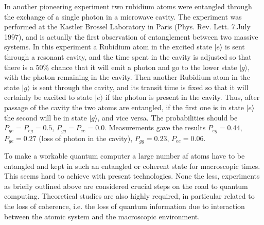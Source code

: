 In another pioneering experiment two rubidium atoms were entangled
through the exchange of a single photon in a microwave cavity.  The
experiment was performed at the Kastler Brossel Laboratory in Paris
(Phys. Rev. Lett. 7.July 1997), and is actually the first observation
of entanglement between two massive systems.  In this experiment a
Rubidium atom in the excited state $|e\rangle$ is sent through a
resonant cavity, and the time spent in the cavity is adjusted so that
there is a 50\% chance that it will emit a photon and go to the lower
state $|g\rangle$, with the photon remaining in the cavity.  Then
another Rubidium atom in the state $|g\rangle$ is sent through the
cavity, and its transit time is fixed so that it will certainly be
excited to state $|e\rangle$ if the photon is present in the cavity.
Thus, after passage of the cavity the two atoms are entangled, if the
first one is in state $|e\rangle$ the second will be in state
$|g\rangle$, and vice versa.  The probabilities should be
$P_{ge}=P_{eg}=0.5$, $P_{gg}=P_{ee}=0.0$.  Measurements gave the
results $P_{eg}=0.44$, $P_{ge}=0.27$ (loss of photon in the cavity),
$P_{gg}=0.23$, $P_{ee}=0.06$.

To make a workable quantum computer a large number af atoms have to be
entangled and kept in such an entangled or coherent state for
macroscopic times. This seems hard to achieve with present
technologies. None the less, experiments as briefly outlined above are
considered crucial steps on the road to quantum computing. Theoretical
studies are also highly required, in particular related to the loss of
coherence, i.e.  the loss of quantum information due to interaction
between the atomic system and the macroscopic environment.



